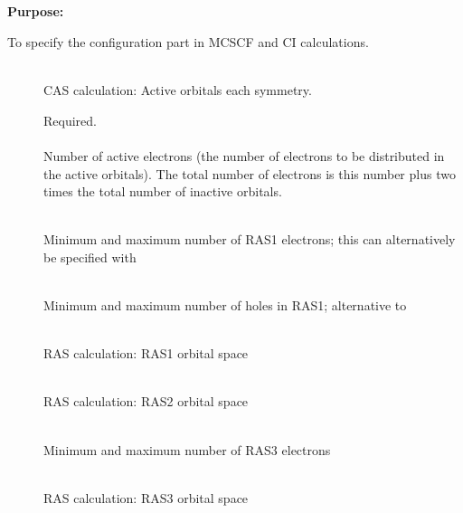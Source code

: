 \pagebreak[3]
\subsection{\label{ref-wavinp}}

{\bf Purpose:}

To specify the configuration part in MCSCF and CI calculations.

\begin{description}
\item[]
   \\
  CAS calculation: Active orbitals each symmetry.

\item[]
  Required.\\
   \\
  Number of active electrons (the number of
  electrons to be distributed
  in the active orbitals).  The total number of electrons is this number
  plus two times the total number of inactive orbitals.

\item[]
    \\
   Minimum and maximum number of RAS1 electrons; this can alternatively
   be specified with 

\item[]
   \\
  Minimum and maximum number of holes in RAS1; alternative
  to 

\item[]
    \\
   RAS calculation: RAS1 orbital space

\item[]
    \\
   RAS calculation: RAS2 orbital space

\item[]
    \\
   Minimum and maximum number of RAS3 electrons

\item[]
    \\
   RAS calculation: RAS3 orbital space


\end{description}
